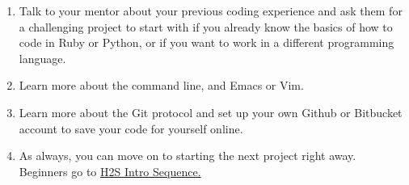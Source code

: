 \documentclass{42-en}
\begin{document}
\begin{enumerate}
	\item Talk to your mentor about your previous coding experience and ask them for a challenging project to start with if you already know the basics of how to code in Ruby or Python, or if you want to work in a different programming language.

	\item Learn more about the command line, and Emacs or Vim.

	\item Learn more about the Git protocol and set up your own Github or Bitbucket account to save your code for yourself online.

	\item As always, you can move on to starting the next project right away. Beginners go to \href{https://projects.intra.42.fr/projects/h2s-intro-sequence}{H2S Intro Sequence.}

\end{enumerate}

\end{document}
